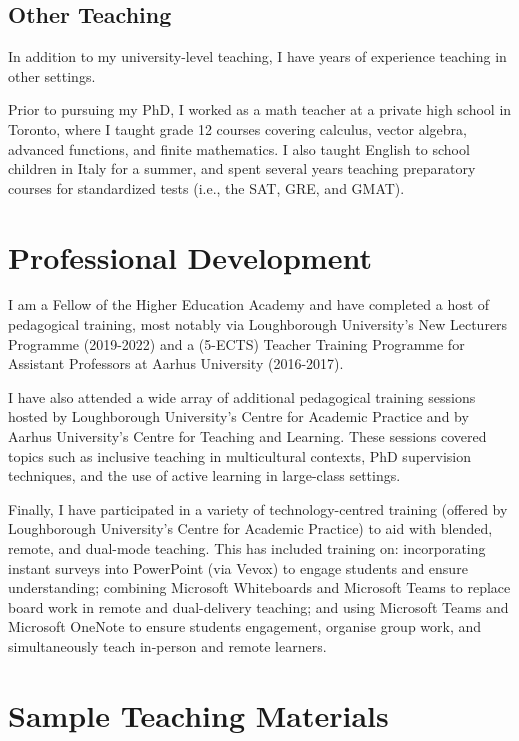 \documentclass[11pt]{article}
\begin{document}
\subsection{Other Teaching}
In addition to my university-level teaching, I have years of experience teaching in other settings. 

Prior to pursuing my PhD, I worked as a math teacher at a private high school in Toronto, where I taught grade 12 courses covering calculus, vector algebra, advanced functions, and finite mathematics. I also taught English to school children in Italy for a summer, and spent several years teaching preparatory courses for standardized tests (i.e., the SAT, GRE, and GMAT).

\section{ Professional Development}

I am a Fellow of the Higher Education Academy and have completed a host of pedagogical training, most notably via Loughborough University's New Lecturers Programme (2019-2022) and a (5-ECTS) Teacher Training Programme for Assistant Professors at Aarhus University (2016-2017). 
	 
I have also attended a wide array of additional pedagogical training sessions hosted by Loughborough University's Centre for Academic Practice and by Aarhus University's Centre for Teaching and Learning. These sessions covered topics such as inclusive teaching in multicultural contexts, PhD supervision techniques, and the use of active learning in large-class settings.
		
Finally, I have participated in a variety of technology-centred training (offered by Loughborough University's Centre for Academic Practice) to aid with blended, remote, and dual-mode teaching. This has included training on: incorporating instant surveys into PowerPoint (via Vevox) to engage students and ensure understanding; combining Microsoft Whiteboards and Microsoft Teams to replace board work in remote and dual-delivery teaching; and using Microsoft Teams and Microsoft OneNote to ensure students engagement, organise group work, and simultaneously teach in-person and remote learners.

\section{ Sample Teaching Materials}
\label{sec:materials}
\end{document}
